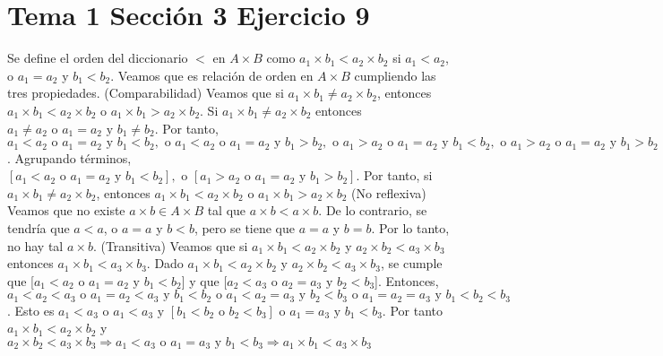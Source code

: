 \documentclass{article}
\begin{document}
\section{Tema 1 Sección 3 Ejercicio 9}
Se define el orden del diccionario \(<\) en \(A\times B\) como \(a_1 \times b_1< a_2 \times b_2\) si \(a_1<a_2\), o \(a_1=a_2\) y \(b_1<b_2\). Veamos que es relación de orden en \(A\times B\) cumpliendo las tres propiedades. (Comparabilidad) Veamos que si \(a_1\times b_1 \neq a_2 \times b_2\), entonces \(a_1\times b_1 < a_2 \times b_2 \text{ o } a_1\times b_1 > a_2 \times b_2 \). Si  \(a_1\times b_1 \neq a_2 \times b_2\) entonces \(a_1\neq a_2 \text{ o } a_1=a_2 \text{ y } b_1\neq b_2\). Por tanto, \(a_1< a_2 \text{ o } a_1=a_2 \text{ y } b_1< b_2, \text{ o }a_1< a_2 \text{ o } a_1=a_2 \text{ y } b_1> b_2, \text{ o }a_1> a_2 \text{ o } a_1=a_2 \text{ y } b_1< b_2, \text{ o }a_1> a_2 \text{ o } a_1=a_2 \text{ y } b_1 > b_2\). Agrupando términos, \([a_1< a_2 \text{ o } a_1=a_2 \text{ y } b_1< b_2], \text{ o }[a_1> a_2 \text{ o } a_1=a_2 \text{ y } b_1> b_2]\). Por tanto, si \(a_1\times b_1 \neq a_2 \times b_2\), entonces \(a_1\times b_1 < a_2\times b_2 \text{ o } a_1\times b_1 > a_2\times b_2 \) (No reflexiva) Veamos que no existe \(a\times b \in A \times B\) tal que \(a\times b < a\times b\). De lo contrario, se tendría que \(a<a\), o \(a=a\) y \(b<b\), pero se tiene que \(a=a\) y \(b=b\). Por lo tanto, no hay tal \(a \times b\). (Transitiva) Veamos que si  \(a_1\times b_1 < a_2 \times b_2\) y \(a_2\times b_2 < a_3 \times b_3\) entonces \(a_1\times b_1 < a_3 \times b_3\). Dado  \(a_1\times b_1 < a_2 \times b_2\) y \(a_2\times b_2 < a_3 \times b_3\), se cumple que [\(a_1 < a_2 \text{ o } a_1=a_2 \text{ y } b_1<b_2\)] y que [\(a_2 < a_3 \text{ o } a_2=a_3 \text{ y } b_2<b_3\)]. Entonces, \(a_1 < a_2 < a_3 \text{ o } a_1 = a_2 < a_3 \text{ y } b_1 < b_2 \text{ o } a_1 < a_2=a_3 \text{ y } b_2<b_3 \text{ o } a_1=a_2=a_3 \text{ y } b_1<b_2<b_3\). Esto es  \(a_1 < a_3 \text{ o } a_1 < a_3 \text{ y } [ b_1 < b_2 \text{ o } b_2<b_3] \text{ o } a_1=a_3 \text{ y } b_1<b_3\). Por tanto \(a_1\times b_1 < a_2 \times b_2\) y \(a_2\times b_2 < a_3 \times b_3 \Rightarrow a_1 < a_3 \text{ o } a_1=a_3 \text{ y } b_1<b_3\Rightarrow a_1\times b_1<a_3 \times b_3\)
\end{document}
